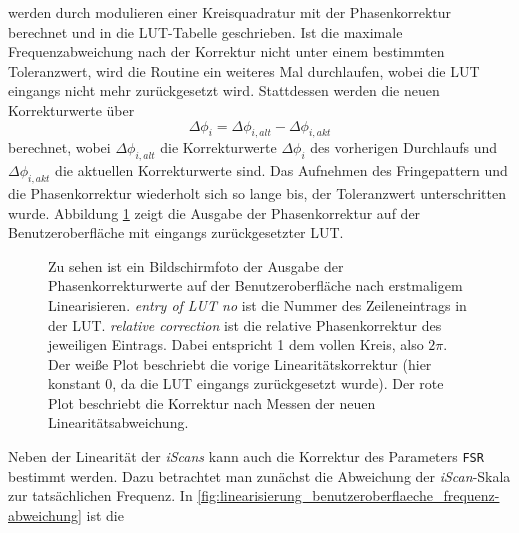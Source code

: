 werden durch modulieren einer Kreisquadratur mit der Phasenkorrektur
berechnet und in die LUT-Tabelle geschrieben. Ist die
maximale Frequenzabweichung nach der Korrektur nicht unter einem bestimmten Toleranzwert, wird die Routine ein weiteres Mal durchlaufen,
wobei die LUT eingangs nicht mehr zurückgesetzt wird. Stattdessen werden
die neuen Korrekturwerte über
\begin{equation}\label{eq:LUT_korrektur_02}
	\Delta\phi_i=\Delta\phi_{i,alt}-\Delta\phi_{i,akt}
\end{equation}
berechnet, wobei $\Delta\phi_{i,alt}$ die Korrekturwerte $\Delta\phi_i$
des vorherigen Durchlaufs und $\Delta\phi_{i,akt}$ die aktuellen Korrekturwerte
sind. Das Aufnehmen des Fringepattern und die Phasenkorrektur wiederholt sich so
lange bis, der Toleranzwert unterschritten wurde. Abbildung
\ref{fig:linearisierung_benutzeroberflaeche_phasenkorrektur} zeigt die Ausgabe der Phasenkorrektur auf der Benutzeroberfläche mit eingangs zurückgesetzter LUT.\par
\begin{figure}[h]
 	\centering
	\caption[Benutzeroberfläche Linearisierung -
	Phasenkorrektur]{Zu sehen ist ein Bildschirmfoto der Ausgabe der
	Phasenkorrekturwerte auf der Benutzeroberfläche nach erstmaligem Linearisieren.
	\textit{entry
	of LUT no} ist die Nummer des Zeileneintrags in der
	LUT. \textit{relative correction} ist die relative Phasenkorrektur des
	jeweiligen Eintrags. Dabei entspricht 1 dem vollen Kreis, also $2\pi$. Der
	weiße Plot beschriebt die vorige Linearitätskorrektur (hier konstant 0, da
	die LUT eingangs zurückgesetzt wurde). Der rote Plot beschriebt die Korrektur
	nach Messen der neuen
	Linearitätsabweichung.}\label{fig:linearisierung_benutzeroberflaeche_phasenkorrektur}
\end{figure}
Neben der Linearität der \textit{iScans} kann auch die Korrektur des Parameters
\lstinline|FSR| bestimmt werden. Dazu betrachtet man zunächst die
Abweichung der \textit{iScan}-Skala zur tatsächlichen Frequenz. In
\ref{fig:linearisierung_benutzeroberflaeche_frequenz-abweichung} ist die
